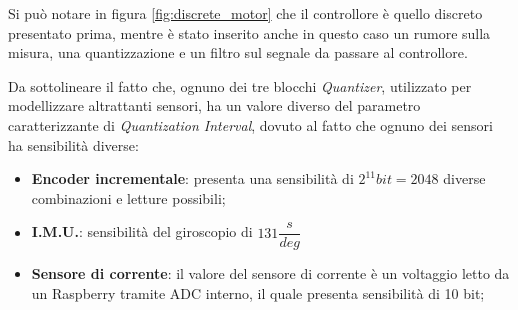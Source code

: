 Si può notare in figura \ref{fig:discrete_motor} che il controllore è quello discreto presentato prima, mentre è stato inserito anche in questo caso un rumore sulla misura, una quantizzazione e un filtro sul segnale da passare al controllore.


Da sottolineare il fatto che, ognuno dei tre blocchi \textit{Quantizer}, utilizzato per modellizzare altrattanti sensori, ha un valore diverso del parametro caratterizzante di \textit{Quantization Interval}, dovuto al fatto che ognuno dei sensori ha sensibilità diverse:
\begin{itemize}
	\item \textbf{Encoder incrementale}: presenta una sensibilità di $2^{11} bit = 2048$ diverse combinazioni e letture possibili;
	\item \textbf{I.M.U.}: sensibilità del giroscopio di $131\dfrac{s}{deg}$
	\item \textbf{Sensore di corrente}: il valore del sensore di corrente è un voltaggio letto da un Raspberry tramite ADC interno, il quale presenta sensibilità di 10 bit;
\end{itemize}